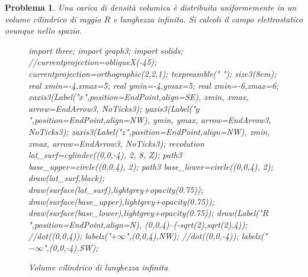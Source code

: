\documentclass[a4paper,oneside]{article}
\newtheorem{problema}{Problema}
\let\oldhat\hat
\renewcommand{\vec}[1]{\mathbf{#1}}
\renewcommand{\hat}[1]{\widehat{\mathbf{#1}}}
\begin{document}
\begin{problema}
	Una carica di densità volumica è distribuita uniformemente in un 
	volume cilindrico di raggio $R$ e lunghezza infinita. Si calcoli 
	il campo elettrostatico ovunque nello spazio.
	\begin{figure}%
			\centering
			\begin{asy}[height=6cm,inline=true,attach=false,viewportwidth=\linewidth]
				import three;
				import graph3;
				import solids;
				//currentprojection=obliqueX(-45);
				currentprojection=orthographic(2,2,1);
				texpreamble("\let\oldhat\hat
				\renewcommand{\vec}[1]{\mathbf{#1}}
				\renewcommand{\hat}[1]{\oldhat{\mathbf{#1}}}");
				size3(8cm);
				real xmin=-4,xmax=5;
				real ymin=-4,ymax=5;
				real zmin=-6,zmax=6;
				xaxis3(Label("\small $x$",position=EndPoint,align=SE),
				xmin, xmax, arrow=EndArrow3, NoTicks3);
				yaxis3(Label("\small $y$",position=EndPoint,align=NW),
				ymin, ymax, arrow=EndArrow3, NoTicks3);
				zaxis3(Label("\small $z$",position=EndPoint,align=NW),
				zmin, zmax, arrow=EndArrow3, NoTicks3);
				revolution lat_surf=cylinder((0,0,-4), 2, 8, Z);
				path3 base_upper=circle((0,0,4), 2);
				path3 base_lower=circle((0,0,4), 2);
				draw(lat_surf,black);
				draw(surface(lat_surf),lightgrey+opacity(0.75));
				draw(surface(base_upper),lightgrey+opacity(0.75));
				draw(surface(base_lower),lightgrey+opacity(0.75));
				draw(Label("$R$",position=EndPoint,align=N),
				(0,0,4)--(-sqrt(2),sqrt(2),4));
				//dot((0,0,4));
				labelz("$+\infty$",(0,0,4),NW);
				//dot((0,0,-4));
				labelz("$-\infty$",(0,0,-4),SW);
			\end{asy}
			\caption{Volume cilindrico di lunghezza infinita}
			\label{fig:cilindro_pieno_infinito}
		\end{figure}	
\end{problema}
\end{document}

